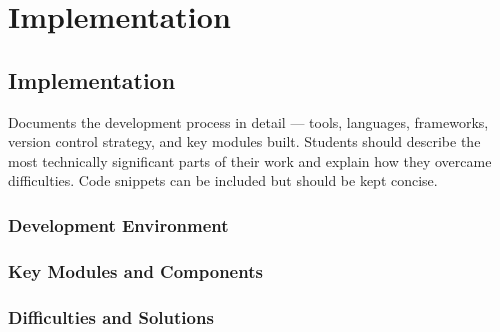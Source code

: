 \chapter{Implementation}
\section{Implementation}


Documents the development process in detail — tools, languages, frameworks, version control strategy, and key modules built. Students should describe the most technically significant parts of their work and explain how they overcame difficulties. Code snippets can be included but should be kept concise.

\subsection{Development Environment}

\subsection{Key Modules and Components}

\subsection{Difficulties and Solutions}
